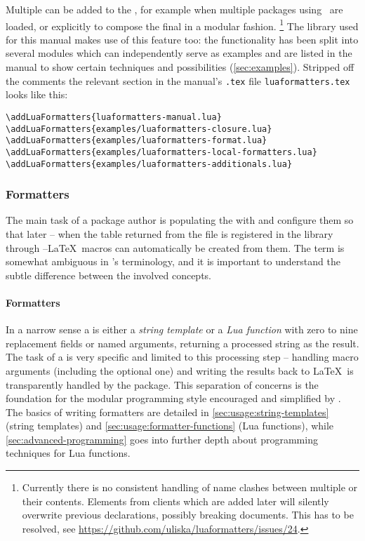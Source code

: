\documentclass[12pt]{scrartcl}
\begin{document}
Multiple  can be added to the ,
for example when multiple packages using \luaformatters\ are loaded, or
explicitly to compose the final  in a modular fashion.%
\footnote{ Currently there is no consistent handling of name clashes
between multiple  or their contents.  Elements from
clients which are added later will silently overwrite previous declarations,
possibly breaking documents. This has to be resolved, see
\url{https://github.com/uliska/luaformatters/issues/24}.} %
The library used for this manual makes use of this feature too: the
functionality has been split into several modules which can independently serve
as examples and are listed in the manual to show certain techniques and
possibilities (\vref{sec:examples}). Stripped off the comments the relevant
section in the manual's \texttt{.tex} file \texttt{luaformatters.tex} looks like
this:

\begin{verbatim}
\addLuaFormatters{luaformatters-manual.lua}
\addLuaFormatters{examples/luaformatters-closure.lua}
\addLuaFormatters{examples/luaformatters-format.lua}
\addLuaFormatters{examples/luaformatters-local-formatters.lua}
\addLuaFormatters{examples/luaformatters-additionals.lua}
\end{verbatim}


\subsubsection{Formatters}
\label{sec:intro:walkthrough:formatters}

The main task of a package author is populating the  with
 and configure them so that later -- when the table
returned from the file is registered in the library through
\texttt{\addLuaFormatters} --\LaTeX\ macros can automatically be
created from them. The term  is somewhat ambiguous in
\luaformatters's terminology, and it is important to understand the subtle
difference between the involved concepts.


\paragraph{Formatters}
\label{sec:intro:walkthrough:formatters}

In a narrow sense a  is either a \emph{string template} or a
\emph{Lua function} with zero to nine replacement fields or named arguments,
returning a processed string as the result.  The task of a  is
very specific and limited to this processing step -- handling macro arguments
(including the optional one) and writing the results back to \LaTeX\ is
transparently handled by the package. This separation of concerns is the
foundation for the modular programming style encouraged and simplified by
\luaformatters.  The basics of writing formatters are detailed in
\vref{sec:usage:string-templates} (string templates) and
\vref{sec:usage:formatter-functions} (Lua functions), while
\vref{sec:advanced-programming} goes into further depth about programming
techniques for Lua functions.
\end{document}
